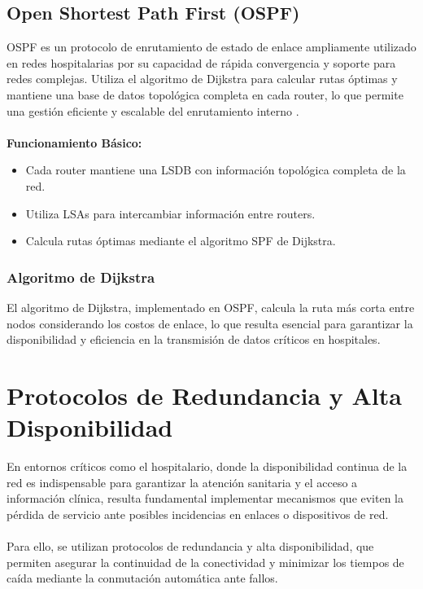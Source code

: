 \subsection{Open Shortest Path First (OSPF)}
\label{subsec:ospf}
OSPF es un protocolo de enrutamiento de estado de enlace ampliamente utilizado en redes hospitalarias por su capacidad de rápida convergencia y soporte para redes complejas. 
Utiliza el algoritmo de Dijkstra para calcular rutas óptimas y mantiene una base de datos topológica completa en cada router, lo que permite una gestión eficiente y escalable 
del enrutamiento interno \cite{cisco-ospf}.
\\ \\
\textbf{Funcionamiento Básico:}
\begin{itemize}
    \item Cada router mantiene una \ac{LSDB} con información topológica completa de la red.
    \item Utiliza \ac{LSA}s para intercambiar información entre routers.
    \item Calcula rutas óptimas mediante el algoritmo \ac{SPF} de Dijkstra.
\end{itemize}

\subsubsection{Algoritmo de Dijkstra}
El algoritmo de Dijkstra, implementado en OSPF, calcula la ruta más corta entre nodos considerando los costos de enlace, lo que resulta esencial para garantizar la disponibilidad 
y eficiencia en la transmisión de datos críticos en hospitales.

\section{Protocolos de Redundancia y Alta Disponibilidad}
En entornos críticos como el hospitalario, donde la disponibilidad continua de la red es indispensable para garantizar la atención sanitaria y el acceso a información 
clínica, resulta fundamental implementar mecanismos que eviten la pérdida de servicio ante posibles incidencias en enlaces o dispositivos de red.
\\ \\
Para ello, se utilizan protocolos de redundancia y alta disponibilidad, que permiten asegurar la continuidad de la conectividad y minimizar los tiempos de caída mediante 
la conmutación automática ante fallos.

